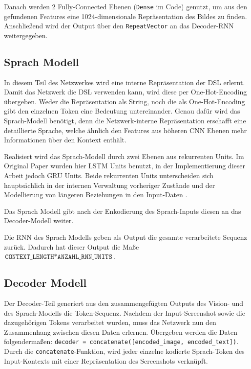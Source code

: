\documentclass[pdftex,a4paper,halfparskip, article]{scrartcl}
\begin{document}
Danach werden 2 Fully-Connected Ebenen (\texttt{Dense} im Code) genutzt, um aus den gefundenen Features eine 1024-dimensionale Repräsentation des Bildes zu finden. Anschließend wird der Output über den \texttt{RepeatVector} an das Decoder-RNN weitergegeben.

\subsection{Sprach Modell}

In diesem Teil des Netzwerkes wird eine interne Repräsentation der DSL erlernt. Damit das Netzwerk die DSL verwenden kann, wird diese per One-Hot-Encoding übergeben. Weder die Repräsentation als String, noch die als One-Hot-Encoding gibt den einzelnen Token eine Bedeutung untereinander. Genau dafür wird das Sprach-Modell benötigt, denn die Netzwerk-interne Repräsentation erschafft eine detaillierte Sprache, welche ähnlich den Features aus höheren CNN Ebenen mehr Informationen über den Kontext enthält. 

Realisiert wird das Sprach-Modell durch zwei Ebenen aus rekurrenten Units. Im Original Paper wurden hier LSTM Units benutzt, in der Implementierung dieser Arbeit jedoch GRU Units. Beide rekurrenten Units unterscheiden sich hauptsächlich in der internen Verwaltung vorheriger Zustände und der Modellierung von längeren Beziehungen in den Input-Daten \cite{colahsBlogLSTM}. 

Das Sprach Modell gibt nach der Enkodierung des Sprach-Inputs diesen an das Decoder-Modell weiter. 

Die RNN des Sprach Modells geben als Output die gesamte verarbeitete Sequenz zurück. Dadurch hat dieser Output die Maße $\texttt{CONTEXT\_LENGTH} * \texttt{ANZAHL\_RNN\_UNITS}$. 


\subsection{Decoder Modell}


Der Decoder-Teil generiert aus den zusammengefügten Outputs des Vision- und des Sprach-Modells die Token-Sequenz. Nachdem der Input-Screenshot sowie die dazugehörigen Tokens verarbeitet wurden, muss das Netzwerk nun den Zusammenhang zwischen diesen Daten erlernen. Übergeben werden die Daten folgendermaßen: \texttt{decoder = concatenate([encoded\_image, encoded\_text])}. Durch die \texttt{concatenate}-Funktion, wird jeder einzelne kodierte Sprach-Token des Input-Kontexts mit einer Repräsentation des Screenshots verknüpft.  
\end{document}
